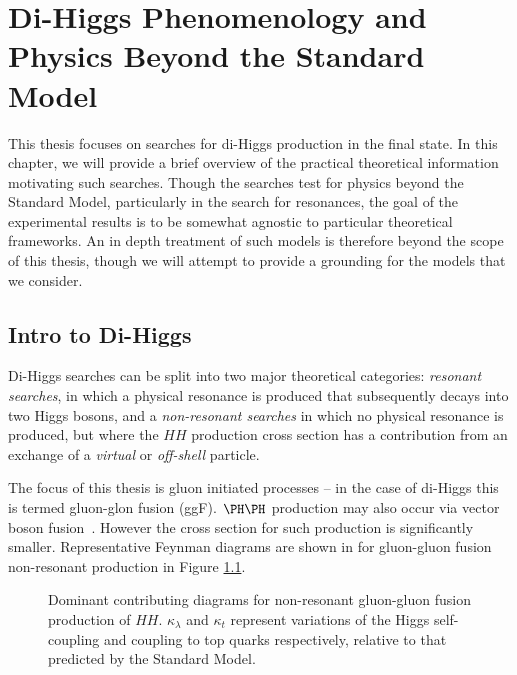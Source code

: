 \chapter{Di-Higgs Phenomenology and Physics Beyond the Standard Model}
\label{chap:hh-bsm}
This thesis focuses on searches for di-Higgs production in the \bbbb final state. In this chapter,
we will provide a brief overview of the practical theoretical information motivating such searches. 
Though the searches test for physics beyond the Standard Model, particularly in the search for 
resonances, the goal of the experimental results is to be somewhat agnostic to particular 
theoretical frameworks. An in depth treatment of such models is therefore beyond the scope 
of this thesis, though we will attempt to provide a grounding for the models that we consider.

\section{Intro to Di-Higgs}
Di-Higgs searches can be split into two major theoretical categories: \emph{resonant searches}, in which a physical resonance is produced that subsequently decays into two Higgs bosons, and a \emph{non-resonant searches} in which no physical resonance is produced, but where the $HH$ production cross section has a contribution from an exchange of a \emph{virtual} or \emph{off-shell} particle. 

The focus of this thesis is gluon initiated processes -- in the case of di-Higgs this is termed gluon-glon fusion
(ggF). $\higgs\higgs$ production may also occur via vector boson fusion~\cite{HDBS-2018-18}. However the cross section for such production is significantly smaller. Representative Feynman diagrams are shown in for gluon-gluon fusion 
non-resonant production in Figure \ref{fig:ggF-diagrams}.

\begin{figure}[ht]
\centering
{}

\caption{\label{fig:ggF-diagrams} Dominant contributing diagrams for non-resonant gluon-gluon fusion production of 
$HH$. $\kappa_{\lambda}$ and $\kappa_{t}$ represent variations of the Higgs self-coupling and coupling to top quarks 
respectively, relative to that predicted by the Standard Model.}
\end{figure}

